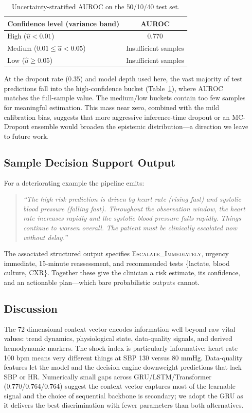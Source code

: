 \documentclass[runningheads]{llncs}
\begin{document}
\begin{table}[h]
\caption{Uncertainty-stratified AUROC on the 50/10/40 test set.}
\label{tab:unc}
\centering\small
\begin{tabular}{lc}
\toprule
\textbf{Confidence level} (variance band) & \textbf{AUROC} \\
\midrule
High ($\hat{u} < 0.01$)                   & 0.770 \\
Medium ($0.01 \leq \hat{u} < 0.05$)       & Insufficient samples \\
Low ($\hat{u} \geq 0.05$)                 & Insufficient samples \\
\bottomrule
\end{tabular}
\end{table}

At the dropout rate (0.35) and model depth used here, the vast majority of test predictions fall into the high-confidence bucket (Table~\ref{tab:unc}), where AUROC matches the full-sample value. The medium/low buckets contain too few samples for meaningful estimation. This mass near zero, combined with the mild calibration bias, suggests that more aggressive inference-time dropout or an MC-Dropout ensemble would broaden the epistemic distribution---a direction we leave to future work.

\subsection{Sample Decision Support Output}
For a deteriorating example the pipeline emits:
\begin{quote}\small
\textit{``The high risk prediction is driven by heart rate (rising fast) and systolic blood pressure (falling fast). Throughout the observation window, the heart rate increases rapidly and the systolic blood pressure falls rapidly. Things continue to worsen overall. The patient must be clinically escalated now without delay.''}
\end{quote}
The associated structured output specifies \textsc{Escalate\_\allowbreak Immediately}, urgency immediate, 15-minute reassessment, and recommended tests \{lactate, blood culture, CXR\}. Together these give the clinician a risk estimate, its confidence, and an actionable plan---which bare probabilistic outputs cannot.

\subsection{Discussion}
The 72-dimensional context vector encodes information well beyond raw vital values: trend dynamics, physiological state, data-quality signals, and derived hemodynamic markers. The shock index is particularly informative: heart rate 100 bpm means very different things at SBP 130 versus 80 mmHg. Data-quality features let the model and the decision engine downweight predictions that lack SBP or HR. Numerically small gaps across GRU/LSTM/Transformer (0.770/0.764/0.764) suggest the context vector captures most of the learnable signal and the choice of sequential backbone is secondary; we adopt the GRU as it delivers the best discrimination with fewer parameters than both alternatives.
\end{document}
